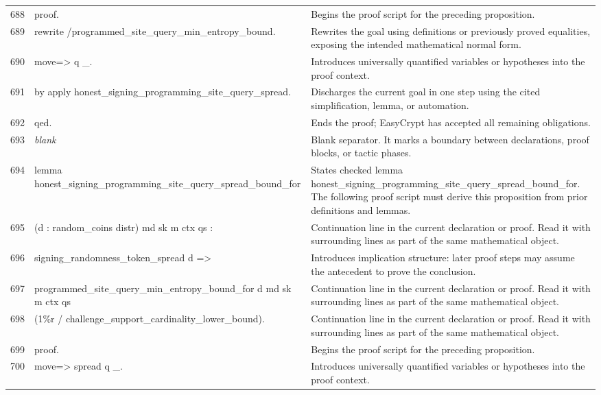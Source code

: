 \documentclass[10pt]{article}
\begin{document}
\begin{longtable}{r L{0.53\textwidth} L{0.37\textwidth}}
688 & {\ttfamily\scriptsize proof.} & Begins the proof script for the preceding proposition. \\
689 & {\ttfamily\scriptsize rewrite /programmed\_site\_query\_min\_entropy\_bound.} & Rewrites the goal using definitions or previously proved equalities, exposing the intended mathematical normal form. \\
690 & {\ttfamily\scriptsize move=> q \_.} & Introduces universally quantified variables or hypotheses into the proof context. \\
691 & {\ttfamily\scriptsize by apply honest\_signing\_programming\_site\_query\_spread.} & Discharges the current goal in one step using the cited simplification, lemma, or automation. \\
692 & {\ttfamily\scriptsize qed.} & Ends the proof; EasyCrypt has accepted all remaining obligations. \\
693 & {\ttfamily\scriptsize \emph{blank}} & Blank separator.  It marks a boundary between declarations, proof blocks, or tactic phases. \\
694 & {\ttfamily\scriptsize lemma honest\_signing\_programming\_site\_query\_spread\_bound\_for} & States checked lemma honest\_signing\_programming\_site\_query\_spread\_bound\_for.  The following proof script must derive this proposition from prior definitions and lemmas. \\
695 & {\ttfamily\scriptsize   (d : random\_coins distr) md sk m ctx qs :} & Continuation line in the current declaration or proof.  Read it with surrounding lines as part of the same mathematical object. \\
696 & {\ttfamily\scriptsize   signing\_randomness\_token\_spread d =>} & Introduces implication structure: later proof steps may assume the antecedent to prove the conclusion. \\
697 & {\ttfamily\scriptsize   programmed\_site\_query\_min\_entropy\_bound\_for d md sk m ctx qs} & Continuation line in the current declaration or proof.  Read it with surrounding lines as part of the same mathematical object. \\
698 & {\ttfamily\scriptsize     (1\%r / challenge\_support\_cardinality\_lower\_bound).} & Continuation line in the current declaration or proof.  Read it with surrounding lines as part of the same mathematical object. \\
699 & {\ttfamily\scriptsize proof.} & Begins the proof script for the preceding proposition. \\
700 & {\ttfamily\scriptsize move=> spread q \_.} & Introduces universally quantified variables or hypotheses into the proof context. \\

\end{longtable}
\end{document}
